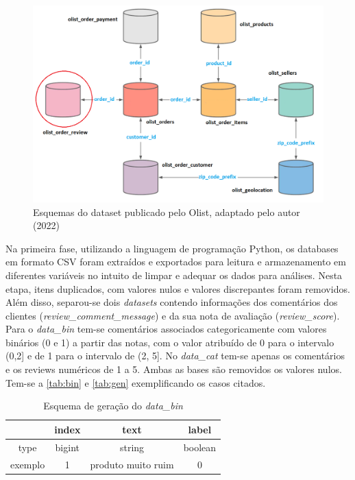 \begin{figure}[H]
    \centering
    \includegraphics[scale=0.52]{./figs/database_schema.png}
    \caption{Esquemas do dataset publicado pelo Olist, adaptado pelo autor (2022)}
    \label{fig:dataset_schema}
\end{figure}


Na primeira fase, utilizando a linguagem de programação Python, os databases em formato CSV foram extraídos e exportados para leitura e armazenamento em diferentes variáveis no intuito de limpar e adequar os dados para análises. Nesta etapa, itens duplicados, com valores nulos e valores discrepantes foram removidos. Além disso, separou-se dois \textit{datasets} contendo informações dos comentários dos clientes (\textit{review\_comment\_message}) e da sua nota de avaliação (\textit{review\_score}). Para o \textit{data\_bin} tem-se comentários associados categoricamente com valores binários (0 e 1) a partir das notas, com o valor atribuído de 0 para o intervalo (0,2] e de 1 para o intervalo de (2, 5]. No \textit{data\_cat} tem-se apenas os comentários e os reviews numéricos de 1 a 5. Ambas as bases são removidos os valores nulos. Tem-se a \autoref{tab:bin} e \autoref{tab:gen} exemplificando os casos citados.


\begin{table}[H]
    \centering
    \begin{tabular}{cccc}
                & index  & text               & label   \\\hline\hline
        type    & bigint & string             & boolean \\\hline
        exemplo & 1      & produto muito ruim & 0
    \end{tabular}
    \caption{Esquema de geração do \textit{data\_bin}}
    \label{tab:bin}
\end{table}

